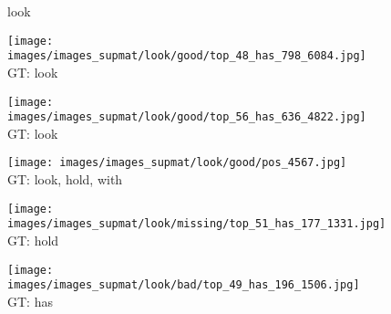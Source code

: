 \documentclass[10pt,twocolumn,letterpaper]{article}
\begin{document}
\begin{figure*}[t]
\begin{minipage}[t]{0.005\textwidth}
    	\centering
    	\vspace{-8.5ex}
    	\begin{turn}{90}
    	look
    	\end{turn}
    	\vspace{3ex}
   	\end{minipage}
    \hspace{0.01\textwidth}
\begin{minipage}[t]{0.18\textwidth}
    	\centering
       	\texttt{[image: images/images\_supmat/look/good/top\_48\_has\_798\_6084.jpg]}\\
       	\vspace{0.3ex}
GT: look
       	\vspace{0.2ex}
    \end{minipage}  
    \hspace{0.005\textwidth}
\begin{minipage}[t]{0.18\textwidth}
    	\centering
       	\texttt{[image: images/images\_supmat/look/good/top\_56\_has\_636\_4822.jpg]}\\
       	\vspace{0.3ex}
GT: look
       	\vspace{0.2ex}
    \end{minipage} 
    \hspace{0.005\textwidth}
\begin{minipage}[t]{0.18\textwidth}
    	\centering
       	\texttt{[image: images/images\_supmat/look/good/pos\_4567.jpg]}\\
       	\vspace{0.3ex}
GT: look, hold, with
       	\vspace{0.2ex}
    \end{minipage}
    \hspace{0.005\textwidth}
\begin{minipage}[t]{0.18\textwidth}
       	\centering
    	\texttt{[image: images/images\_supmat/look/missing/top\_51\_has\_177\_1331.jpg]}\\
    	\vspace{0.3ex}
GT: hold
       	\vspace{0.2ex}
    \end{minipage}
    \hspace{0.005\textwidth}
\begin{minipage}[t]{0.18\textwidth}
    	\centering
       	\texttt{[image: images/images\_supmat/look/bad/top\_49\_has\_196\_1506.jpg]}\\
       	\vspace{0.3ex}
GT: has
       	\vspace{0.2ex}
    \end{minipage}    
     

\end{figure*}
\end{document}
